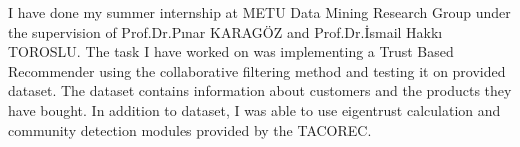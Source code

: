 I have done my summer internship at METU Data Mining Research Group under the supervision of Prof.Dr.Pınar KARAGÖZ and Prof.Dr.İsmail Hakkı TOROSLU. The task I have worked on was implementing a Trust Based Recommender using the collaborative filtering method and testing it on provided dataset. The dataset contains information about customers and the products they have bought. In addition to dataset, I was able to use eigentrust calculation and community detection modules provided by the TACOREC.